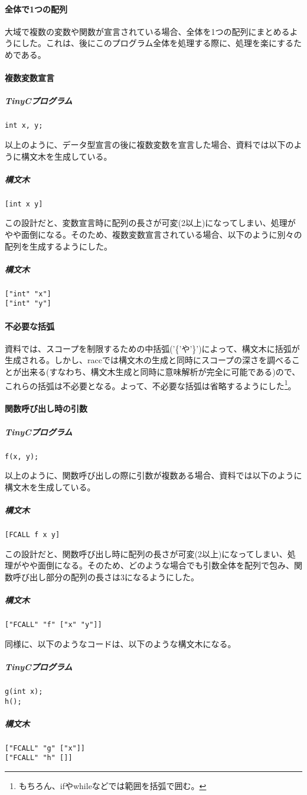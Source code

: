 \documentclass[titlepage, a4paper,12pt]{jarticle}
\begin{document}
\paragraph{全体で1つの配列}
大域で複数の変数や関数が宣言されている場合、全体を1つの配列にまとめるようにした。これは、後にこのプログラム全体を処理する際に、処理を楽にするためである。
\paragraph{複数変数宣言}
\subparagraph{TinyCプログラム}
\begin{verbatim}
int x, y;
\end{verbatim}
以上のように、データ型宣言の後に複数変数を宣言した場合、資料では以下のように構文木を生成している。
\subparagraph{構文木}
\begin{verbatim}
[int x y]
\end{verbatim}
この設計だと、変数宣言時に配列の長さが可変(2以上)になってしまい、処理がやや面倒になる。そのため、複数変数宣言されている場合、以下のように別々の配列を生成するようにした。
\subparagraph{構文木}
\begin{verbatim}
["int" "x"]
["int" "y"]
\end{verbatim}
\paragraph{不必要な括弧}
資料では、スコープを制限するための中括弧('\{'や'\}')によって、構文木に括弧が生成される。しかし、raccでは構文木の生成と同時にスコープの深さを調べることが出来る(すなわち、構文木生成と同時に意味解析が完全に可能である)ので、これらの括弧は不必要となる。よって、不必要な括弧は省略するようにした\footnote{もちろん、ifやwhileなどでは範囲を括弧で囲む。}。
\paragraph{関数呼び出し時の引数}
\subparagraph{TinyCプログラム}
\begin{verbatim}
f(x, y);
\end{verbatim}
以上のように、関数呼び出しの際に引数が複数ある場合、資料では以下のように構文木を生成している。
\subparagraph{構文木}
\begin{verbatim}
[FCALL f x y]
\end{verbatim}
この設計だと、関数呼び出し時に配列の長さが可変(2以上)になってしまい、処理がやや面倒になる。そのため、どのような場合でも引数全体を配列で包み、関数呼び出し部分の配列の長さは3になるようにした。
\subparagraph{構文木}
\begin{verbatim}
["FCALL" "f" ["x" "y"]]
\end{verbatim}
同様に、以下のようなコードは、以下のような構文木になる。
\subparagraph{TinyCプログラム}
\begin{verbatim}
g(int x);
h();
\end{verbatim}
\subparagraph{構文木}
\begin{verbatim}
["FCALL" "g" ["x"]]
["FCALL" "h" []]
\end{verbatim}
\end{document}
